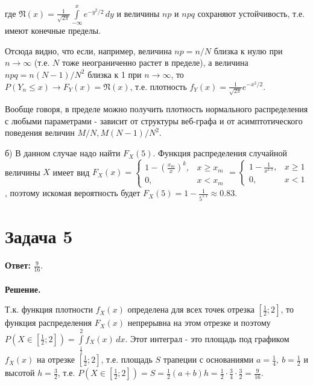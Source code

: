 \documentclass{article}
\begin{document}
 где $\mathfrak{N}(x)=\frac{1}{\sqrt{2\pi}}\int\limits_{-\infty}^x e^{-y^2/2}\,dy$ и величины $np$ и $npq$ сохраняют устойчивость, т.е. имеют конечные пределы. 
 \par
 Отсюда видно, что если, например, величина $np=n/N$ близка к нулю при $n\to\infty$ (т.е. $N$ тоже неограниченно растет в пределе), а величина $npq=n(N-1)/N^2$ близка к 1 при $n\to\infty$, то $P(Y_n \leq x)\to F_Y(x)=\mathfrak{N}(x)$, т.е. плотность $f_Y(x)=\frac{1}{\sqrt{2\pi}}e^{-x^2/2}$.
 \par
 Вообще говоря, в пределе можно получить плотность нормального распределения с любыми параметрами - зависит от структуры веб-графа и от асимптотического поведения величин $M/N, M(N-1)/N^2$.
 \par
 б) В данном случае надо найти $F_X(5)$. Функция распределения случайной величины $X$ имеет вид $F_X(x)=
 \begin{cases}
    1-\left(\frac{x_m}{x}\right)^{k}, &x \geq x_m\\
    0, &x < x_m
 \end{cases}=
 \begin{cases}
    1-\frac{1}{x^{1.1}}, &x\geq 1\\
    0, &x < 1
 \end{cases}$, поэтому искомая вероятность будет $F_X(5)=1-\frac{1}{5^{1.1}}\approx0.83$.
\section*{Задача 5}
{\bf Ответ: } $\frac{9}{16}$.
\\
\\
{\bf Решение.} 
\par
Т.к. функция плотности $f_X(x)$ определена для всех точек отрезка $[\frac{1}{2}; 2]$, то функция распределения $F_X(x)$ непрерывна на этом отрезке и поэтому $P(X \in [\frac{1}{2}; 2])=\int\limits_{\frac{1}{2}}^2 f_X(x)\,dx$. Этот интеграл - это площадь под графиком $f_X(x)$ на отрезке $[\frac{1}{2}; 2]$, т.е. площадь $S$ трапеции с основаниями $a=\frac{1}{4},\ b=\frac{1}{2}$ и высотой $h=\frac{3}{2}$, т.е.  $P(X \in [\frac{1}{2}; 2])=S=\frac{1}{2}(a+b)h=\frac{1}{2}\cdot\frac{3}{4}\cdot\frac{3}{2}=\frac{9}{16}$.
\end{document}
